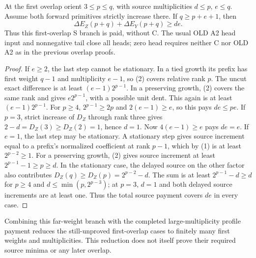 \begin{corollary}
At the first overlap orient $3\le p\le q$, with source
multiplicities $d\le p$, $e\le q$. Assume both forward primitives
strictly increase there. If $q\ge p+e+1$, then
\[
               \Delta E_Z(p+q)+\Delta E_Y(p+q)\ge de.
\]
Thus this first-overlap S branch is paid, without C. The usual
OLD A2 head input and nonnegative tail close all heads; zero head
requires neither C nor OLD A2 as in the previous overlap proofs.
\end{corollary}
\begin{proof}
If $e\ge2$, the last step cannot be stationary. In a tied growth
its prefix has first weight $q-1$ and multiplicity $e-1$, so (2)
covers relative rank $p$. The uncut exact difference is at least
$(e-1)2^{p-1}$. In a preserving growth, (2) covers the same rank
and gives $e2^{p-1}$, with a possible unit dent. This again is at
least $(e-1)2^{p-1}$. For $p\ge4$, $2^{p-1}\ge2p$ and
$2(e-1)\ge e$, so this pays $de\le pe$.
If $p=3$, strict increase of $D_Z$ through rank three gives
$2-d=D_Z(3)\ge D_Z(2)=1$, hence $d=1$.
Now $4(e-1)\ge e$ pays $de=e$.
If $e=1$, the last step may be stationary. A stationary step gives
source increment equal to a prefix's normalized coefficient at
rank $p-1$, which by (1) is at least $2^{p-2}\ge1$.
For a preserving growth, (2) gives source increment at least
$2^{p-1}-1\ge p\ge d$.
In the stationary case, the delayed source on the other factor
also contributes $D_Z(q)\ge D_Z(p)=2^{p-2}-d$.
The sum is at least $2^{p-1}-d\ge d$ for $p\ge4$ and
$d\le\min(p,2^{p-3})$; at $p=3$, $d=1$ and both delayed
source increments are at least one. Thus the total source payment
covers $de$ in every case.
\end{proof}

Combining this far-weight branch with the completed large-multiplicity
profile payment reduces the still-unproved first-overlap cases to
finitely many first weights and multiplicities. This reduction does
not itself prove their required source minima or any later overlap.
